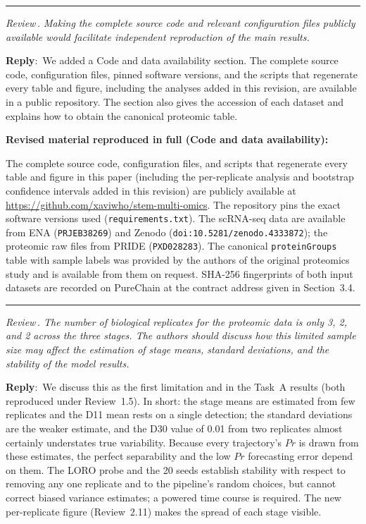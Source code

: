 \documentclass[11pt]{article}
\newcounter{reviewer}
\newcounter{point}[reviewer]
\renewcommand{\thepoint}{Review\,\thereviewer.\arabic{point}}
\newcommand{\point}[1]{\refstepcounter{point}  \bigskip \hrule \medskip \noindent \textit{{\fontseries{b}\selectfont \thepoint } #1}\par}
\newcommand{\reply}{\medskip \noindent \textbf{Reply}:\ }
\newcommand{\revisedheading}[1]{\medskip\noindent\textbf{Revised material
  reproduced in full (#1):}\par}
\newenvironment{revised}{\par\color{red}}{\par}
\begin{document}
\point{Making the complete source code and relevant configuration files publicly available would facilitate independent reproduction of the main results.}

\reply{We added a Code and data availability section. The complete source code, configuration files, pinned software versions, and the scripts that regenerate every table and figure, including the analyses added in this revision, are available in a public repository. The section also gives the accession of each dataset and explains how to obtain the canonical proteomic table.}

\revisedheading{Code and data availability}
\begin{revised}
The complete source code, configuration files, and scripts that regenerate every table and figure in this paper (including the per-replicate analysis and bootstrap confidence intervals added in this revision) are publicly available at \url{https://github.com/xaviwho/stem-multi-omics}. The repository pins the exact software versions used (\texttt{requirements.txt}). The scRNA-seq data are available from ENA (\texttt{PRJEB38269}) and Zenodo (\texttt{doi:10.5281/zenodo.4333872}); the proteomic raw files from PRIDE (\texttt{PXD028283}). The canonical \texttt{proteinGroups} table with sample labels was provided by the authors of the original proteomics study and is available from them on request. SHA-256 fingerprints of both input datasets are recorded on PureChain at the contract address given in Section~3.4.
\end{revised}

\point{The number of biological replicates for the proteomic data is only 3, 2, and 2 across the three stages. The authors should discuss how this limited sample size may affect the estimation of stage means, standard deviations, and the stability of the model results.}

\reply{We discuss this as the first limitation and in the Task~A results (both reproduced under Review~1.5). In short: the stage means are estimated from few replicates and the D11 mean rests on a single detection; the standard deviations are the weaker estimate, and the D30 value of 0.01 from two replicates almost certainly understates true variability. Because every trajectory's $Pr$ is drawn from these estimates, the perfect separability and the low $Pr$ forecasting error depend on them. The LORO probe and the 20 seeds establish stability with respect to removing any one replicate and to the pipeline's random choices, but cannot correct biased variance estimates; a powered time course is required. The new per-replicate figure (Review~2.11) makes the spread of each stage visible.}
\end{document}
